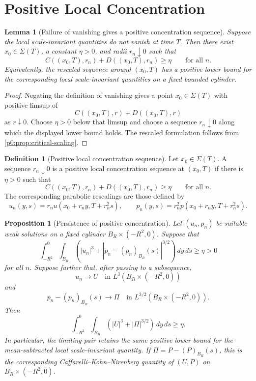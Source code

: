 \documentclass[11pt]{amsart}
\theoremstyle{plain}
\newtheorem{lemma}[lemma]{Lemma}
\newtheorem{proposition}[proposition]{Proposition}
\theoremstyle{definition}
\newtheorem{definition}[definition]{Definition}
\theoremstyle{remark}
\numberwithin{equation}{section}
\begin{document}
\section{Positive Local Concentration}

\begin{lemma}[Failure of vanishing gives a positive concentration sequence]
\label{p0:lem:positive-concentration}
Suppose the local scale-invariant quantities do not vanish at time \(T\).  Then
there exist \(x_0\in\Sigma(T)\), a constant \(\eta>0\), and radii
\(r_n\downarrow0\) such that
\[
  C((x_0,T),r_n)+D((x_0,T),r_n)\ge\eta
  \qquad\text{for all }n.
\]
Equivalently, the rescaled sequence around \((x_0,T)\) has a positive lower
bound for the corresponding local scale-invariant quantities on a fixed
bounded cylinder.
\end{lemma}

\begin{proof}
Negating the definition of vanishing gives a point \(x_0\in\Sigma(T)\) with
positive limsup of
\[
  C((x_0,T),r)+D((x_0,T),r)
\]
as \(r\downarrow0\).  Choose \(\eta>0\) below that limsup and choose a sequence
\(r_n\downarrow0\) along which the displayed lower bound holds.  The rescaled
formulation follows from \cref{p0:prop:critical-scaling}.
\end{proof}

\begin{definition}[Positive local concentration sequence]
\label{p0:def:positive-concentration-sequence}
Let \(x_0\in\Sigma(T)\).  A sequence \(r_n\downarrow0\) is a positive local
concentration sequence at \((x_0,T)\) if there is \(\eta>0\) such that
\[
  C((x_0,T),r_n)+D((x_0,T),r_n)\ge\eta
  \qquad\text{for all }n.
\]
The corresponding parabolic rescalings are those defined by
\[
  u_n(y,s)=r_nu(x_0+r_ny,T+r_n^2s),
  \qquad
  p_n(y,s)=r_n^2p(x_0+r_ny,T+r_n^2s).
\]
\end{definition}

\begin{proposition}[Persistence of positive concentration]
\label{p0:prop:compactness-persistence}
Let \((u_n,p_n)\) be suitable weak solutions on a fixed cylinder
\(B_R\times(-R^2,0)\).  Suppose that
\[
  \int_{-R^2}^{0}\int_{B_R}
  \left(|u_n|^3+|p_n-(p_n)_{B_R}(s)|^{3/2}\right)\,dy\,ds
  \ge\eta>0
\]
for all \(n\).  Suppose further that, after passing to a subsequence,
\[
  u_n\to U\quad\text{in }L^3(B_R\times(-R^2,0))
\]
and
\[
  p_n-(p_n)_{B_R}(s)\to \Pi
  \quad\text{in }L^{3/2}(B_R\times(-R^2,0)).
\]
Then
\[
  \int_{-R^2}^{0}\int_{B_R}
  \left(|U|^3+|\Pi|^{3/2}\right)\,dy\,ds\ge\eta.
\]
In particular, the limiting pair retains the same positive lower bound for the
mean-subtracted local scale-invariant quantity.  If
\(\Pi=P-(P)_{B_R}(s)\), this is the corresponding
Caffarelli--Kohn--Nirenberg quantity of \((U,P)\) on
\(B_R\times(-R^2,0)\).
\end{proposition}
\end{document}
